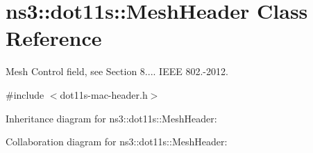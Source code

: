 \hypertarget{classns3_1_1dot11s_1_1MeshHeader}{}\section{ns3\+:\+:dot11s\+:\+:Mesh\+Header Class Reference}
\label{classns3_1_1dot11s_1_1MeshHeader}


Mesh Control field, see Section 8.... I\+E\+EE 802.-\/2012.  




{\ttfamily \#include $<$dot11s-\/mac-\/header.\+h$>$}



Inheritance diagram for ns3\+:\+:dot11s\+:\+:Mesh\+Header\+:


Collaboration diagram for ns3\+:\+:dot11s\+:\+:Mesh\+Header\+:
